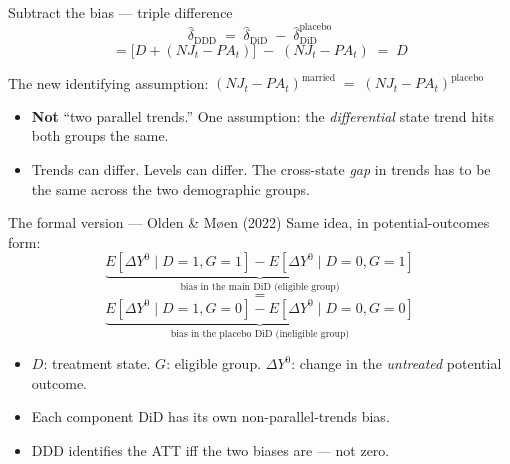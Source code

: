 \documentclass[aspectratio=169,11pt]{beamer}
\begin{document}
\begin{frame}{Subtract the bias --- triple difference}
\vspace{0.4em}
\[
\widehat{\delta}_{\text{DDD}} \;=\; \widehat{\delta}_{\text{DiD}} \;-\; \widehat{\delta}^{\text{placebo}}_{\text{DiD}}
\]
\vspace{-0.2em}
\[
= \big[D + (NJ_t - PA_t)\big] \;-\; (NJ_t - PA_t) \;=\; D
\]
\vspace{0.3em}
\begin{block}{The new identifying assumption: }
\small
\centering
$(NJ_t - PA_t)^{\text{married}} \;=\; (NJ_t - PA_t)^{\text{placebo}}$
\end{block}
\vspace{0.4em}
\begin{itemize}\small
  \item \textbf{Not} ``two parallel trends.'' One assumption: the \textit{differential} state trend hits both groups the same.
  \item Trends can differ. Levels can differ. The cross-state \textit{gap} in trends has to be the same across the two demographic groups.
\end{itemize}
\end{frame}

\begin{frame}{The formal version --- Olden \& Møen (2022)}
\vspace{0.3em}
{\footnotesize Same idea, in potential-outcomes form:}
\vspace{-0.2em}
\[
\underbrace{E[\Delta Y^0 \mid D=1, G=1] - E[\Delta Y^0 \mid D=0, G=1]}_{\text{bias in the main DiD (eligible group)}}
\]
\vspace{-0.6em}
\[
=
\]
\vspace{-0.6em}
\[
\underbrace{E[\Delta Y^0 \mid D=1, G=0] - E[\Delta Y^0 \mid D=0, G=0]}_{\text{bias in the placebo DiD (ineligible group)}}
\]
\vspace{0.2em}
\begin{itemize}\small
  \item $D$: treatment state. \;$G$: eligible group. \;$\Delta Y^0$: change in the \textit{untreated} potential outcome.
  \item Each component DiD has its own non-parallel-trends bias.
  \item DDD identifies the ATT iff the two biases are  --- not zero.
\end{itemize}
\vspace{0.2em}
\end{frame}
\end{document}
